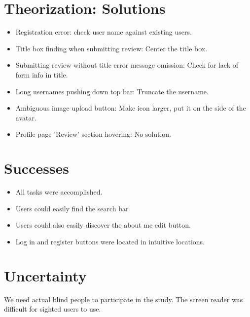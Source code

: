 \documentclass[11pt]{extarticle}
\begin{document}
\section*{Theorization: Solutions}
\begin{itemize}
\item Registration error: check user name against existing users.
\item Title box finding when submitting review: Center the title box.
\item Submitting review without title error message omission: Check for lack of form info in title.
\item Long usernames pushing down top bar: Truncate the username.
\item Ambiguous image upload button: Make icon larger, put it on the side of the avatar.
\item Profile page 'Review' section hovering: No solution.
\end{itemize}

\section*{Successes}
\begin{itemize}
\item All tasks were accomplished.
\item Users could easily find the search bar
\item Users could also easily discover the about me edit button.
\item Log in and register buttons were located in intuitive locations.
\end{itemize}

\section*{Uncertainty}
We need actual blind people to participate in the study. The screen reader was difficult for sighted users to
use. 
\end{document}
